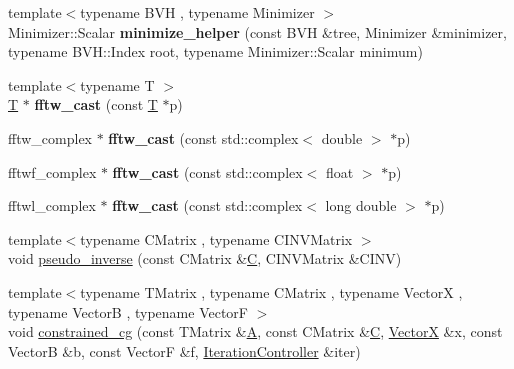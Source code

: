 \begin{DoxyCompactItemize}
\item 
\mbox{\label{namespace_eigen_1_1internal_a002b42404006e5045ec2bc089a573263}} 
{\footnotesize template$<$typename B\+VH , typename Minimizer $>$ }\\Minimizer\+::\+Scalar {\bfseries minimize\+\_\+helper} (const B\+VH \&tree, Minimizer \&minimizer, typename B\+V\+H\+::\+Index root, typename Minimizer\+::\+Scalar minimum)
\item 
\mbox{\label{namespace_eigen_1_1internal_a9a08d5192b170b2a01281d3c7f5c90f9}} 
{\footnotesize template$<$typename T $>$ }\\\hyperlink{group___sparse_core___module}{T} $\ast$ {\bfseries fftw\+\_\+cast} (const \hyperlink{group___sparse_core___module}{T} $\ast$p)
\item 
\mbox{\label{namespace_eigen_1_1internal_aa425e20cb2f88459fe5bbbda37e81341}} 
fftw\+\_\+complex $\ast$ {\bfseries fftw\+\_\+cast} (const std\+::complex$<$ double $>$ $\ast$p)
\item 
\mbox{\label{namespace_eigen_1_1internal_ab51c5ec854fde8fae9919dd60592ee87}} 
fftwf\+\_\+complex $\ast$ {\bfseries fftw\+\_\+cast} (const std\+::complex$<$ float $>$ $\ast$p)
\item 
\mbox{\label{namespace_eigen_1_1internal_a40adf9344ed03bfec39ad22e924933ea}} 
fftwl\+\_\+complex $\ast$ {\bfseries fftw\+\_\+cast} (const std\+::complex$<$ long double $>$ $\ast$p)
\item 
{\footnotesize template$<$typename C\+Matrix , typename C\+I\+N\+V\+Matrix $>$ }\\void \hyperlink{namespace_eigen_1_1internal_a58a0ccf0e71d88beeb5dcf72ed0bdd5f}{pseudo\+\_\+inverse} (const C\+Matrix \&\hyperlink{group___core___module}{C}, C\+I\+N\+V\+Matrix \&C\+I\+NV)
\item 
{\footnotesize template$<$typename T\+Matrix , typename C\+Matrix , typename VectorX , typename VectorB , typename VectorF $>$ }\\void \hyperlink{namespace_eigen_1_1internal_a1c2f99746877fd46158af4a6b7dce2f9}{constrained\+\_\+cg} (const T\+Matrix \&\hyperlink{group___core___module_class_eigen_1_1_matrix}{A}, const C\+Matrix \&\hyperlink{group___core___module}{C}, \hyperlink{group___core___module}{VectorX} \&x, const VectorB \&b, const VectorF \&f, \hyperlink{class_eigen_1_1_iteration_controller}{Iteration\+Controller} \&iter)

\end{DoxyCompactItemize}
